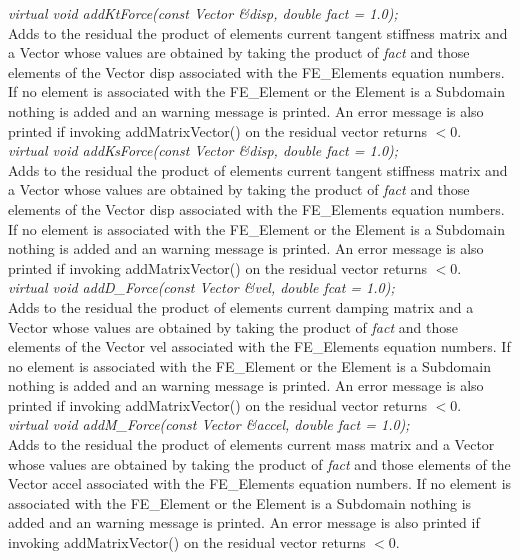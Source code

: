 {{\em virtual void addKtForce(const Vector \&disp, double fact = 1.0);    }\\
Adds to the residual the product of elements current tangent stiffness matrix
and a Vector whose values are obtained by taking the product of {\em
fact} and those elements of the Vector \p disp associated with 
the FE\_Elements equation numbers. If no element is associated with the
FE\_Element or the Element is a Subdomain nothing is added and an
warning message is printed. An error message is also printed if invoking
addMatrixVector() on the residual vector returns $< 0$.\\

{\em virtual void addKsForce(const Vector \&disp, double fact = 1.0);    }\\
Adds to the residual the product of elements current tangent stiffness matrix
and a Vector whose values are obtained by taking the product of {\em
fact} and those elements of the Vector \p disp associated with 
the FE\_Elements equation numbers. If no element is associated with the
FE\_Element or the Element is a Subdomain nothing is added and an
warning message is printed. An error message is also printed if invoking
addMatrixVector() on the residual vector returns $< 0$.\\


{\em virtual void addD\_Force(const Vector \&vel, double fcat = 1.0); }\\
Adds to the residual the product of elements current damping matrix
and a Vector whose values are obtained by taking the product of {\em
fact} and those elements of the Vector \p vel associated with 
the FE\_Elements equation numbers. If no element is associated with the
FE\_Element or the Element is a Subdomain nothing is added and an
warning message is printed. An error message is also printed if invoking
addMatrixVector() on the residual vector returns $< 0$.\\


{\em virtual void addM\_Force(const Vector \&accel, double fact = 1.0); }\\
Adds to the residual the product of elements current mass matrix
and a Vector whose values are obtained by taking the product of {\em
fact} and those elements of the Vector \p accel associated with 
the FE\_Elements equation numbers. If no element is associated with the
FE\_Element or the Element is a Subdomain nothing is added and an
warning message is printed. An error message is also printed if invoking
addMatrixVector() on the residual vector returns $< 0$.\\

}
